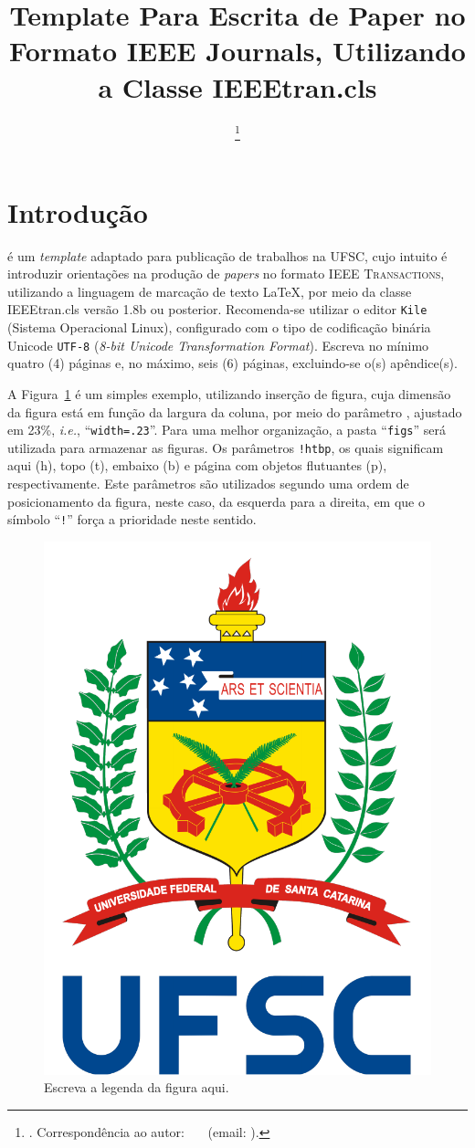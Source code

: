 \documentclass[journal]{IEEEtran}
\title                                                {Template Para Escrita de Paper no Formato IEEE Journals, Utilizando a Classe IEEEtran.cls}
\author{\IEEEauthorblockN{\prenomePrincipal~\nomedomeioPrincipal~\sobrenomePrincipal\IEEEauthorrefmark{1}}

\IEEEauthorblockA{\IEEEauthorrefmark{1}Universidade Federal de Santa Catarina (UFSC)}%
\thanks{\Revista. Correspond\^encia ao autor: \prenomePrincipal~\nomedomeioPrincipal~\sobrenomePrincipal~(email: \emailautor).}}
\newcommand{\siglaRevista}                            {UFSC}
\begin{document}
\maketitle
\IEEEdisplaynontitleabstractindextext
\IEEEpeerreviewmaketitle


\section{Introdução}

 é um \textit{template} adaptado para publicação de trabalhos na \siglaRevista, cujo intuito é introduzir orientações na produção de \textit{papers} no formato IEEE \textsc{Transactions}, utilizando a linguagem de marcação de texto \LaTeX, por meio da classe \nohyphens{IEEEtran.cls} versão 1.8b ou posterior. Recomenda-se utilizar o editor {\ttfamily\fontsize{9}{9}\selectfont\texttt{Kile}} (Sistema Operacional Linux), configurado com o tipo de codificação binária Unicode {\ttfamily\fontsize{9}{9}\selectfont\texttt{UTF-8}} (\textit{8-bit Unicode Transformation Format}). Escreva no mínimo quatro (4) páginas e, no máximo, seis (6) páginas, excluindo-se o(s) apêndice(s).

A Figura~\ref{fig:fig_exemple} é um simples exemplo, utilizando inserção de figura, cuja dimensão da figura está em função da largura da coluna, por meio do parâmetro {\ttfamily\fontsize{9}{9}\selectfont\texttt{\string\columnwidth}}, ajustado em 23\%, \textit{i.e.}, ``{\ttfamily\fontsize{9}{9}\selectfont\texttt{width=.23\string\columnwidth}}''. Para uma melhor organização, a pasta ``{\ttfamily\fontsize{9}{9}\selectfont\texttt{figs}}'' será utilizada para armazenar as figuras. Os parâmetros {\ttfamily\fontsize{9}{9}\selectfont\texttt{!htbp}}, os quais significam aqui (h), topo (t), embaixo (b) e página com objetos flutuantes (p), respectivamente. Este parâmetros são utilizados segundo uma ordem de posicionamento da figura, neste caso, da esquerda para a direita, em que o símbolo ``{\ttfamily\fontsize{9}{9}\selectfont\texttt{!}}'' força a prioridade neste sentido.
\begin{figure}[!htbp]
\centering
\includegraphics[width=.23\columnwidth]{figs/brasao_UFSC_vertical_sigla.pdf}
\caption{Escreva a legenda da figura aqui.}
\label{fig:fig_exemple}
\end{figure}
\end{document}
